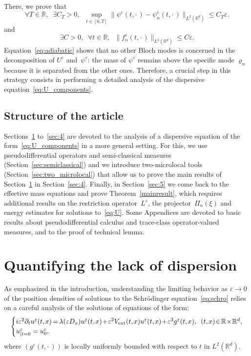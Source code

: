 \documentclass[AHL,Unicode,longabstracts]{cedram}
\DeclareMathOperator{\ext}{ext}
\newcommand*\R{{\mathbb R}}
\newcommand*\eps{\varepsilon}
\numberwithin{equation}{section}
\newcommand*{\mk}{\mkern -1mu}
\newcommand*{\Mk}{\mkern -2mu}
\let\oldexists\exists
\renewcommand*{\exists}{\mathrel{\oldexists}}
\let\oldforall\forall
\renewcommand*{\forall}{\mathrel{\oldforall}}
\begin{document}
\goodbreak
There, we prove that
\begin{equation}\label{eq:adiabatic}
\forall T\in\R,\;\;\exists C_T>0,\;\; \sup_{t\in[0,T]} \| \psi^\eps(t,\cdot\,)- \psi^\eps_n(t,\cdot\,)\|_{L^2(\R^d)}\leq C_T \eps.
\end{equation}
and
\begin{equation}\label{eq:fneps}
\exists C>0,\;\;
\forall t\in\R,\;\;\|f_n^\eps(t,\cdot\,)\|_{L^2(\R^d)}\leq C\eps.
\end{equation}
Equation~\eqref{eq:adiabatic} shows that no other Bloch modes is concerned in the decomposition of $U^\eps$ and~$\psi^\eps$: the mass of $\psi^\eps$ remains above the specific mode $\varrho_n$ because it is separated from the other ones. Therefore, a crucial step in this strategy consists in performing a detailed analysis of the dispersive equation~\eqref{eq:U_components}.



\subsection{Structure of the article}
Sections~\ref{sec:disp} to~\ref{sec:4} are devoted to the analysis of a dispersive equation of the form~\eqref{eq:U_components} in a more general setting. For this, we use pseudodifferential operators and semi-classical measures (Section~\ref{sec:semiclassical}) and we introduce two-microlocal tools (Section~\ref{sec:two_microlocal}) that allow us to prove the main results of Section~\ref{sec:disp} in Section~\ref{sec:4}. Finally, in Section~\ref{sec:5} we come back to the effective mass equations and prove Theorem~\ref{mainresult}, which requires additional results on the restriction operator~$L^\eps$, the projector~$\Pi_n(\xi)$ and energy estimates for solutions to~\eqref{eq:U}. Some Appendices are devoted to basic results about pseudodifferential calculus and trace-class operator-valued measures, and to the proof of technical lemma.



\section{Quantifying the lack of dispersion}\label{sec:disp}

As emphasized in the introduction, understanding the limiting behavior as $\eps\to0$ of the position densities of solutions to the Schr\"odinger equation~\eqref{eq:schro} relies on a careful analysis of the solutions of equations of the form:
\begin{equation}\label{eq:disp2}
\!\!\begin{cases}
i\eps^2 \partial_{t} u^{\eps}(t,\mk x) \Mk=\Mk \lambda(\eps D_x) u^{\eps}(t,\mk x) \!+\! \eps^2 V_{\ext}(t,\mk x) u^{\eps}(t,\mk x)\!+\!\eps^3g^\eps(t,\mk x), &\!\!(t,\mk x)\!\in\!\R\!\times\!\R^d,\\
u^\eps_{|t=0}=u^\eps_0,
\end{cases}\!\!
\end{equation}
where $(g^\eps(t,\cdot\,))$ is locally uniformly bounded with respect to $t$ in $L^2(\R^d)$.
\end{document}
